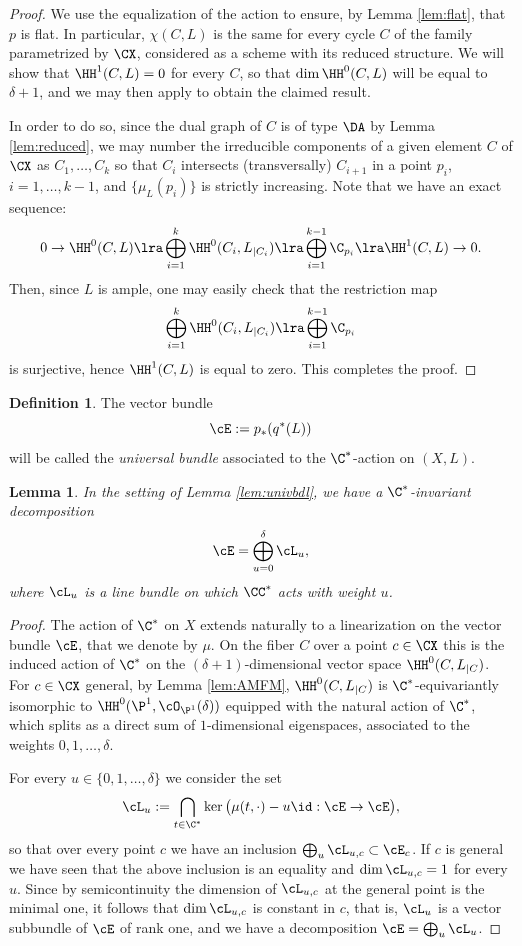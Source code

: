 \documentclass[reqno]{amsproc}
\newtheorem{lemma}[theorem]{Lemma}
\theoremstyle{definition}
\newtheorem{definition}[theorem]{Definition}
\begin{document}
\begin{proof}
We use the equalization of the action to ensure, by Lemma \ref{lem:flat}, that $p$ is flat. In particular, $\chi(C,L)$ is the same for every cycle $C$  of the family parametrized by $\CX$, considered as a scheme with its reduced structure. We will show that $\HH^1(C,L)=0$ for every $C$, so that $\dim\HH^0(C,L)$ will be equal to $\delta+1$, and we may then apply \cite[Corollary~III.12.9]{Ha} to obtain the claimed result. 

In order to do so, since the dual graph of $C$ is of type $\DA$ by Lemma \ref{lem:reduced}, we may  number the irreducible components  of a given element $C$ of $\CX$ as $C_1,\dots,C_k$  so that $C_i$ intersects (transversally) $C_{i+1}$ in a point $p_i$, $i=1,\dots,k-1$, and $\{\mu_L(p_i)\}$ is strictly increasing. Note that we have an exact sequence:
\begin{equation}
0\to \HH^0(C,L)\lra \bigoplus_{i=1}^{k}\HH^0(C_i,L_{|C_i})\lra \bigoplus_{i=1}^{k-1}\C_{p_i}\lra \HH^1(C,L)\to 0.
\label{eq:irredcomp}
\end{equation}
Then, since $L$ is ample, one may easily check that the restriction map
$$
\bigoplus_{i=1}^{k}\HH^0(C_i,L_{|C_i})\lra \bigoplus_{i=1}^{k-1}\C_{p_i}
$$
is surjective, hence  $\HH^1(C,L)$ is equal to zero. This completes the proof.
\end{proof}


\begin{definition}
The vector bundle $$\cE:=p_*(q^*(L))$$ will be called the {\em universal bundle} associated to the $\C^*$-action on $(X,L)$.
\end{definition}

\begin{lemma}
In the setting of Lemma \ref{lem:univbdl}, we have a $\C^*$-invariant decomposition $$\cE=\bigoplus_{u=0}^\delta \cL_u,$$ where $\cL_u$ is a line bundle on which $\CC^*$ acts with weight $u$.
\end{lemma}

\begin{proof}
The action of $\C^*$ on $X$ extends naturally to a linearization on the vector bundle $\cE$, that we denote by $\mu$. On the fiber $C$ over a point $c\in \CX$ this is the induced action of $\C^*$ on the $(\delta+1)$-dimensional vector space $\HH^0(C,L_{|C})$. For $c\in\CX$ general,  by Lemma \ref{lem:AMFM}, $\HH^0(C,L_{|C})$ is $\C^*$-equivariantly isomorphic to $\HH^0(\P^1,\cO_{\P^1}(\delta))$ equipped with the natural action of $\C^*$, which splits as a direct sum of $1$-dimensional eigenspaces, associated to the weights $0,1,\dots,\delta$. 

For every $u\in\{0,1,\dots,\delta\}$ we consider the set $$\cL_u:=\bigcap_{t\in \C^*}\ker\big(\mu(t,\cdot)-u\id:\cE\to \cE\big),$$ 
so that over every point $c$ we have an inclusion $\bigoplus_{u}\cL_{u,c}\subset \cE_c$. If $c$ is general we have seen that the above inclusion is an equality and $\dim\cL_{u,c}=1$ for every $u$. Since by semicontinuity the dimension of $\cL_{u,c}$ at the general point is the minimal one, it follows that $\dim\cL_{u,c}$ is constant in $c$, that is, $\cL_u$ is a vector subbundle of $\cE$ of rank one, and we have a decomposition $\cE=\bigoplus_u\cL_u$. 
\end{proof}
\end{document}
